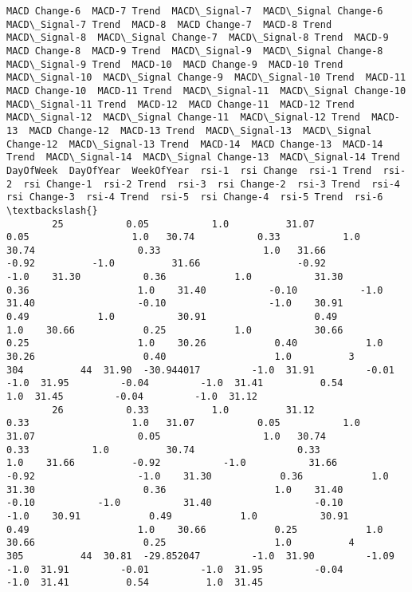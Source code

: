 \documentclass[11pt]{article}
\begin{document}
\begin{Verbatim}[commandchars=\\\{\}]
            MACD Change-6  MACD-7 Trend  MACD\_Signal-7  MACD\_Signal Change-6  MACD\_Signal-7 Trend  MACD-8  MACD Change-7  MACD-8 Trend  MACD\_Signal-8  MACD\_Signal Change-7  MACD\_Signal-8 Trend  MACD-9  MACD Change-8  MACD-9 Trend  MACD\_Signal-9  MACD\_Signal Change-8  MACD\_Signal-9 Trend  MACD-10  MACD Change-9  MACD-10 Trend  MACD\_Signal-10  MACD\_Signal Change-9  MACD\_Signal-10 Trend  MACD-11  MACD Change-10  MACD-11 Trend  MACD\_Signal-11  MACD\_Signal Change-10  MACD\_Signal-11 Trend  MACD-12  MACD Change-11  MACD-12 Trend  MACD\_Signal-12  MACD\_Signal Change-11  MACD\_Signal-12 Trend  MACD-13  MACD Change-12  MACD-13 Trend  MACD\_Signal-13  MACD\_Signal Change-12  MACD\_Signal-13 Trend  MACD-14  MACD Change-13  MACD-14 Trend  MACD\_Signal-14  MACD\_Signal Change-13  MACD\_Signal-14 Trend  DayOfWeek  DayOfYear  WeekOfYear  rsi-1  rsi Change  rsi-1 Trend  rsi-2  rsi Change-1  rsi-2 Trend  rsi-3  rsi Change-2  rsi-3 Trend  rsi-4  rsi Change-3  rsi-4 Trend  rsi-5  rsi Change-4  rsi-5 Trend  rsi-6  \textbackslash{}
        25           0.05           1.0          31.07                  0.05                  1.0   30.74           0.33           1.0          30.74                  0.33                  1.0   31.66          -0.92          -1.0          31.66                 -0.92                 -1.0    31.30           0.36            1.0           31.30                  0.36                   1.0    31.40           -0.10           -1.0           31.40                  -0.10                  -1.0    30.91            0.49            1.0           30.91                   0.49                   1.0    30.66            0.25            1.0           30.66                   0.25                   1.0    30.26            0.40            1.0           30.26                   0.40                   1.0          3        304          44  31.90  -30.944017         -1.0  31.91         -0.01         -1.0  31.95         -0.04         -1.0  31.41          0.54          1.0  31.45         -0.04         -1.0  31.12   
        26           0.33           1.0          31.12                  0.33                  1.0   31.07           0.05           1.0          31.07                  0.05                  1.0   30.74           0.33           1.0          30.74                  0.33                  1.0    31.66          -0.92           -1.0           31.66                 -0.92                  -1.0    31.30            0.36            1.0           31.30                   0.36                   1.0    31.40           -0.10           -1.0           31.40                  -0.10                  -1.0    30.91            0.49            1.0           30.91                   0.49                   1.0    30.66            0.25            1.0           30.66                   0.25                   1.0          4        305          44  30.81  -29.852047         -1.0  31.90         -1.09         -1.0  31.91         -0.01         -1.0  31.95         -0.04         -1.0  31.41          0.54          1.0  31.45   

\end{Verbatim}
\end{document}
